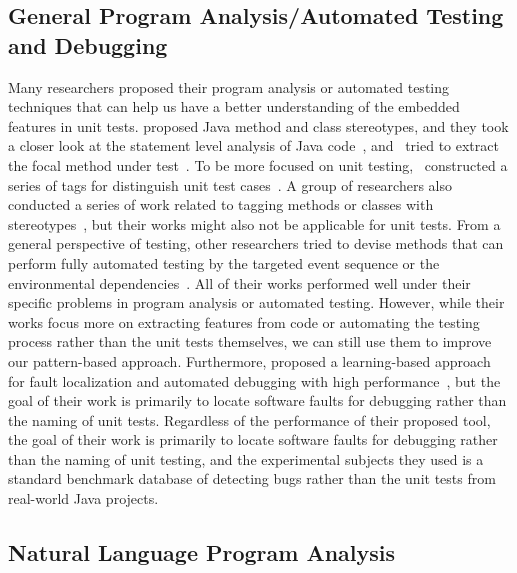 \subsection{General Program Analysis\slash Automated Testing and Debugging}

Many researchers proposed their program analysis or automated testing techniques that can help us have a better understanding of the embedded features in unit tests. 
%
\citeauthor{moreno2012jstereocode} proposed Java method and class stereotypes, and they took a closer look at the statement level analysis of Java code~\cite{moreno2012jstereocode}, and~\citeauthor{ghafari2015automatically} tried to extract the focal method under test~\cite{ghafari2015automatically}.
%
To be more focused on unit testing,~\citeauthor{li2018aiding} constructed a series of tags for distinguish unit test cases~\cite{li2018aiding}.
%
A group of researchers also conducted a series of work related to tagging methods or classes with stereotypes~\cite{dragan2006reverse,dragan2010automatic,dragan2011emergent,sharif2013identifying,alhindawi2013improving}, but their works might also not be applicable for unit tests.
%
From a general perspective of testing, other researchers tried to devise methods that can perform fully automated testing by the targeted event sequence or the environmental dependencies~\cite{jensen2013automated,arcuri2014automated}.
%
All of their works performed well under their specific problems in program analysis or automated testing. 
However, while their works focus more on extracting features from code or automating the testing process rather than the unit tests themselves, we can still use them to improve our pattern-based approach.
%
Furthermore, \citeauthor{li2019deepfl} proposed a learning-based approach for fault localization and automated debugging with high performance~\cite{li2019deepfl}, but the goal of their work is primarily to locate software faults for debugging rather than the naming of unit tests. 
%
Regardless of the performance of their proposed tool, the goal of their work is primarily to locate software faults for debugging rather than the naming of unit testing, and the experimental subjects they used is a standard benchmark database of detecting bugs rather than the unit tests from real-world Java projects.


\subsection{Natural Language Program Analysis}


